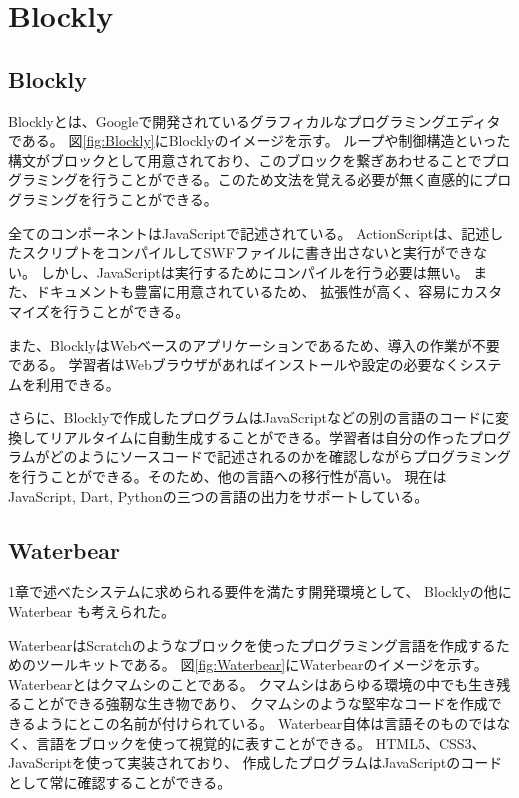 \documentclass{risepaper}
\begin{document}
\section{Blockly}

\subsection{Blockly}
                                                          
Blocklyとは、Googleで開発されているグラフィカルなプログラミングエディタである。
図\ref{fig:Blockly}にBlocklyのイメージを示す。
ループや制御構造といった構文がブロックとして用意されており、このブロックを繋ぎあわせることでプログラミングを行うことができる。このため文法を覚える必要が無く直感的にプログラミングを行うことができる。

全てのコンポーネントはJavaScriptで記述されている。
ActionScriptは、記述したスクリプトをコンパイルしてSWFファイルに書き出さないと実行ができない。
しかし、JavaScriptは実行するためにコンパイルを行う必要は無い。
また、ドキュメントも豊富に用意されているため、
拡張性が高く、容易にカスタマイズを行うことができる。

また、BlocklyはWebベースのアプリケーションであるため、導入の作業が不要である。
学習者はWebブラウザがあればインストールや設定の必要なくシステムを利用できる。

さらに、Blocklyで作成したプログラムはJavaScriptなどの別の言語のコードに変換してリアルタイムに自動生成することができる。学習者は自分の作ったプログラムがどのようにソースコードで記述されるのかを確認しながらプログラミングを行うことができる。そのため、他の言語への移行性が高い。
現在はJavaScript, Dart, Pythonの三つの言語の出力をサポートしている。

\subsection{Waterbear}

1章で述べたシステムに求められる要件を満たす開発環境として、
Blocklyの他にWaterbear \cite{Thesis06}も考えられた。

WaterbearはScratchのようなブロックを使ったプログラミング言語を作成するためのツールキットである。
図\ref{fig:Waterbear}にWaterbearのイメージを示す。
Waterbearとはクマムシのことである。
クマムシはあらゆる環境の中でも生き残ることができる強靭な生き物であり、
クマムシのような堅牢なコードを作成できるようにとこの名前が付けられている。
Waterbear自体は言語そのものではなく、言語をブロックを使って視覚的に表すことができる。
HTML5、CSS3、JavaScriptを使って実装されており、
作成したプログラムはJavaScriptのコードとして常に確認することができる。
\end{document}
